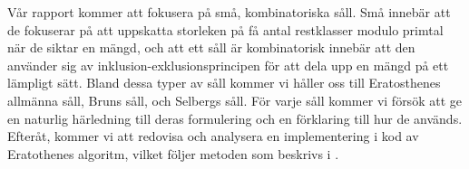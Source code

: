Vår rapport kommer att fokusera på små, kombinatoriska såll. Små innebär att de fokuserar på att uppskatta storleken på få antal restklasser modulo primtal när de siktar en mängd, och att ett såll är kombinatorisk innebär att den använder sig av inklusion-exklusionsprincipen för att dela upp en mängd på ett lämpligt sätt. Bland dessa typer av såll kommer vi håller oss till Eratosthenes allmänna såll, Bruns såll, och Selbergs såll. För varje såll kommer vi försök att ge en naturlig härledning till deras formulering och en förklaring till hur de används. Efteråt, kommer vi att redovisa och analysera en implementering i kod av Eratothenes algoritm, vilket följer metoden som beskrivs i \cite{HaraldSieve}.